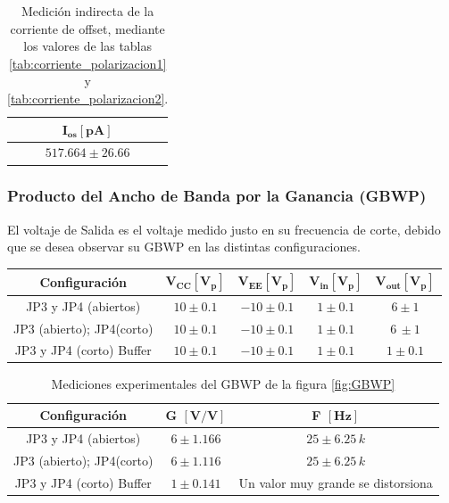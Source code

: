         \begin{table}[H]
          \centering
          \begin{tabular}{|c|}
            \hline
            $\mathbf{I_{os} [pA]}$ \\
            \hline
            $517.664 \pm 26.66$ \\
            \hline
          \end{tabular}
          \caption{Medición indirecta de la corriente de offset, mediante los valores de las tablas \ref{tab:corriente_polarizacion1} y \ref{tab:corriente_polarizacion2}.}
          \label{tab:corriente_offset}
        \end{table} 

    \subsubsection{Producto del Ancho de Banda por la Ganancia (GBWP)}   

        El voltaje de Salida es el voltaje medido justo en su frecuencia de corte, debido que se desea observar su GBWP en las distintas configuraciones.

        \begin{table}[H]
          \centering
          \begin{tabular}{|c|c|c|c|c|}
            \hline
            \textbf{Configuración} & $\mathbf{V_{CC} [V_p]}$ & $\mathbf{V_{EE} [V_p]}$ & $\mathbf{V_{in} [V_p]}$ & $\mathbf{V_{out} [V_p]}$ \\
            \hline
            JP3 y JP4 (abiertos) & $10 \pm 0.1$ & $-10 \pm 0.1$ & $1 \pm 0.1$ & $6 \pm 1$  \\
            \hline
            JP3 (abierto); JP4(corto) & $10 \pm 0.1$ & $-10 \pm 0.1$ & $1 \pm 0.1$  & $6 \, \pm 1$ \\
            \hline
            JP3 y JP4 (corto) Buffer & $10 \pm 0.1$ & $-10 \pm 0.1$ & $1 \pm 0.1$  & $1 \pm 0.1 $ \\
            \hline
          \end{tabular}
        \end{table}
        \begin{table}[H]
          \centering
          \begin{tabular}{|c|c|c|}
            \hline
            \textbf{Configuración} & \textbf{G} $\mathbf{[V/V]}$ & \textbf{F} $\mathbf{[Hz]}$ \\
            \hline
            JP3 y JP4 (abiertos) & $6 \pm 1.166$ & $25 \pm 6.25 \, k $ \\
            \hline
            JP3 (abierto); JP4(corto) & $6 \pm 1.116$ & $25 \pm 6.25 \, k$ \\
            \hline
            JP3 y JP4 (corto) Buffer & $1 \pm 0.141$ & Un valor muy grande se distorsiona \\
            \hline
          \end{tabular}
          \caption{Mediciones experimentales del GBWP de la figura \ref{fig:GBWP}}
          \label{tab:gbwp}
        \end{table}

